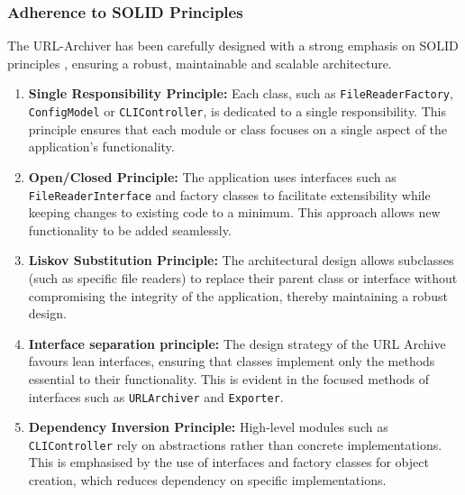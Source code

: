 \subsubsection{Adherence to SOLID Principles}
The URL-Archiver has been carefully designed with a strong emphasis on SOLID principles , ensuring a robust, maintainable and scalable architecture.

\begin{enumerate}
	\item \textbf{Single Responsibility Principle:} Each class, such as \texttt{FileReaderFactory}, \texttt{ConfigModel} or \texttt{CLIController}, is dedicated to a single responsibility. This principle ensures that each module or class focuses on a single aspect of the application's functionality.
	\item \textbf{Open/Closed Principle:} The application uses interfaces such as \texttt{FileReaderInterface} and factory classes to facilitate extensibility while keeping changes to existing code to a minimum. This approach allows new functionality to be added seamlessly.
	\item \textbf{Liskov Substitution Principle:} The architectural design allows subclasses (such as specific file readers) to replace their parent class or interface without compromising the integrity of the application, thereby maintaining a robust design.
	\item \textbf{Interface separation principle:} The design strategy of the URL Archive favours lean interfaces, ensuring that classes implement only the methods essential to their functionality. This is evident in the focused methods of interfaces such as \texttt{URLArchiver} and \texttt{Exporter}.
	\item \textbf{Dependency Inversion Principle:} High-level modules such as \texttt{CLIController} rely on abstractions rather than concrete implementations. This is emphasised by the use of interfaces and factory classes for object creation, which reduces dependency on specific implementations.
\end{enumerate}

